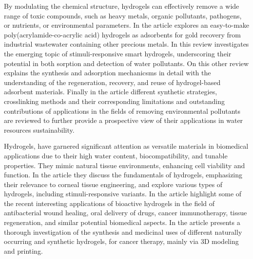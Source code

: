 By modulating the chemical structure, hydrogels can effectively remove a wide range of toxic compounds, such as heavy metals, organic pollutants, pathogens, or nutrients, or environmental parameters.
In the article\citep{cinfrigniniGoldRushDesigning2024} explores an easy-to-make poly(acrylamide-co-acrylic acid) hydrogels as adsorbents for gold recovery from industrial wastewater containing other precious metals.
In this review\citep{randoFunctionalBioBasedPolymeric2024} investigates the emerging topic of stimuli-responsive smart hydrogels, underscoring their potential in both sorption and detection of water pollutants.
On this other review\citep{darbanHydrogelBasedAdsorbentMaterial2022a} explains the synthesis and adsorption mechanicsms in detail with the understanding of the regeneration, recovery, and reuse of hydrogel-based adsorbent materials.
Finally in the article\citep{songSynthesisHydrogelsTheir2022} different synthetic strategies, crosslinking methods and their corresponding limitations and outstanding contributions of applications in the fields of removing environmental pollutants are reviewed to further provide a prospective view of their applications in water resources sustainability.

Hydrogels, have garnered significant attention as versatile materials in biomedical applications due to their high water content, biocompatibility, and tunable properties. 
They mimic natural tissue environments, enhancing cell viability and function.
In the article\citep{wuAdvancementsHydrogelsCorneal2024} they discuss the fundamentals of hydrogels, emphasizing their relevance to corneal tissue engineering, and explore various types of hydrogels, including stimuli-responsive variants.
In the article\citep{kaurHydrogelsPotentialBiomaterial2024} highlight some of the recent interesting applications of bioactive hydrogels in the field of antibacterial wound healing, oral delivery of drugs, cancer immunotherapy, tissue regeneration, and similar potential biomedical aspects.
In the article\citep{thummaIntroductionClassificationApplications2025} presents a thorough investigation of the synthesis and medicinal uses of different naturally occurring and synthetic hydrogels, for cancer therapy, mainly via 3D modeling and printing.

